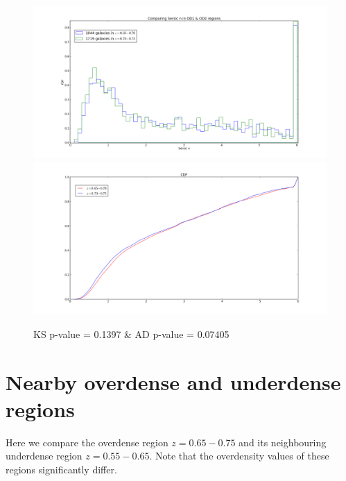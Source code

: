 \documentclass[a4paper,10pt]{article}
\begin{document}
\begin{figure}[ht]
 \centering
 \includegraphics[scale=0.3]{hist_sersicn_ODOD.png}
 \includegraphics[scale=0.3]{cdf_sersicn_ODOD.png}
 \caption{KS p-value = 0.1397 \& AD p-value = 0.07405}
 
\end{figure}

\pagebreak 
\section{Nearby overdense and underdense regions}
Here we compare the overdense region $z=0.65-0.75$ and its neighbouring underdense region $z=0.55-0.65$. Note that the overdensity values
of these regions significantly differ.
\end{document}
